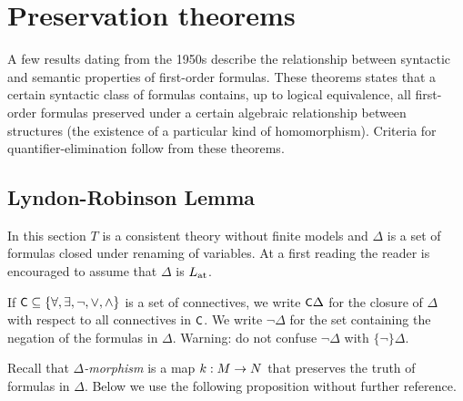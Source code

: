 \chapter{Preservation theorems}
\label{eliminazione}
\def\ceq#1#2#3{\noindent\smash{\parbox[t]{15ex}{$\displaystyle #1$}}\parbox{6ex}{\hfil $#2$}{$\displaystyle #3$}}


A few results dating from the 1950s describe the relationship between syntactic and semantic properties of first-order formulas. These theorems states that a certain syntactic class of formulas contains, up to logical equivalence, all first-order formulas preserved under a certain algebraic relationship between structures (the existence of a particular kind of homomorphism). Criteria for quantifier-elimination follow from these theorems.

\section{Lyndon-Robinson Lemma}
\label{TeoremidiPreservazione}

In this section $T$ is a consistent theory without finite models and $\Delta$ is a set of formulas closed under renaming of variables. At a first reading the reader is encouraged to assume that $\Delta$ is $L_{\rm at}$. 

If $\textsf{\small C}\subseteq\{\forall,\exists,\neg,\vee,\wedge\}$ is a set of connectives, we write \emph{$\textsf{\small C}\Delta$} for the closure of $\Delta$ with respect to all connectives in $\textsf{\small C}$. We write \emph{$\neg\Delta$} for the set containing the negation of the formulas in $\Delta$. Warning: do not confuse $\neg\Delta$ with $\{\neg\}\Delta$.





% 
% 



Recall that \emph{$\Delta$-morphism\/} is a map $k:M\rightarrow N$ that preserves the truth of formulas in $\Delta$. Below we use the following proposition without further reference.

